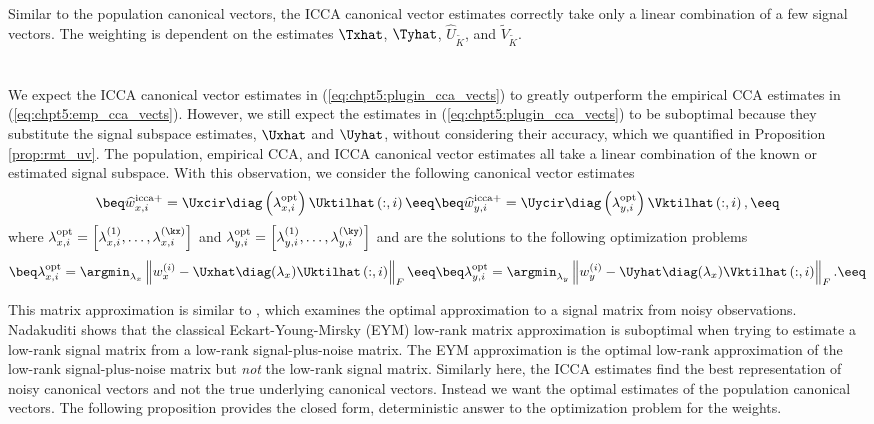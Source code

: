 Similar to the population canonical vectors, the ICCA canonical
vector estimates correctly take only a linear combination of a few signal vectors. The
weighting is dependent on the estimates $\Txhat$, $\Tyhat$, $\widehat{U}_{\widetilde{K}}$,
and $\widetilde{V}_{\widetilde{K}}$. 

\section{\iccap}\label{sec:chpt5:iccap}
We expect the ICCA canonical vector estimates in (\ref{eq:chpt5:plugin_cca_vects}) to
greatly outperform the empirical CCA estimates in (\ref{eq:chpt5:emp_cca_vects}). However,
we still expect the estimates in (\ref{eq:chpt5:plugin_cca_vects}) to be suboptimal
because they substitute the signal subspace estimates, $\Uxhat$ and $\Uyhat$, without
considering their accuracy, which we quantified in Proposition \ref{prop:rmt_uv}. The
population, empirical CCA, and ICCA canonical vector estimates all take a linear
combination of the known or estimated signal subspace. With this observation, we consider
the following canonical vector estimates
\begin{subequations}\label{eq:chpt5:opt_cca_vects} 
\beq
\widehat{w}_{x,i}^{\text{icca+}} = \Uxcir\diag\left(\lambda_{x,i}^{\text{opt}}\right)\Uktilhat\left(:,i\right)
\eeq
\beq
\widehat{w}_{y,i}^{\text{icca+}} = \Uycir\diag\left(\lambda_{y,i}^{\text{opt}}\right)\Vktilhat\left(:,i\right),
\eeq
\end{subequations}
where 
$\lambda_{x,i}^{\text{opt}}=\left[\lambda_{x,i}^{(1)},\dots,\lambda_{x,i}^{(\kx)}\right]$ and
$\lambda_{y,i}^{\text{opt}}=\left[\lambda_{y,i}^{(1)},\dots,\lambda_{y,i}^{(\ky)}\right]$ and are the
solutions to the following optimization problems
\begin{subequations}\label{eq:chpt5:can_vec_opt_prob}
\beq
\lambda_{x,i}^{\text{opt}} = \argmin_{\lambda_x}\left\|w_x^{(i)} -
  \Uxhat\diag(\lambda_x)\Uktilhat\left(:,i\right)\right\|_F
\eeq
\beq
\lambda_{y,i}^{\text{opt}} = \argmin_{\lambda_y}\left\|w_y^{(i)} -
  \Uyhat\diag(\lambda_x)\Vktilhat\left(:,i\right)\right\|_F.
\eeq
\end{subequations}

This matrix approximation is similar to \cite{nadakuditi2014optshrink}, which examines the
optimal approximation to a signal matrix from noisy observations. Nadakuditi shows that
the classical Eckart-Young-Mirsky (EYM) low-rank matrix approximation is suboptimal when
trying to estimate a low-rank signal matrix from a low-rank signal-plus-noise matrix. The
EYM approximation is the optimal low-rank approximation of the low-rank signal-plus-noise
matrix but \textit{not} the low-rank signal matrix. Similarly here, the ICCA estimates
find the best representation of noisy canonical vectors and not the true underlying
canonical vectors. Instead we want the optimal estimates of the population canonical
vectors. The following proposition provides the closed form, deterministic answer to the
optimization problem for the \iccap weights.

